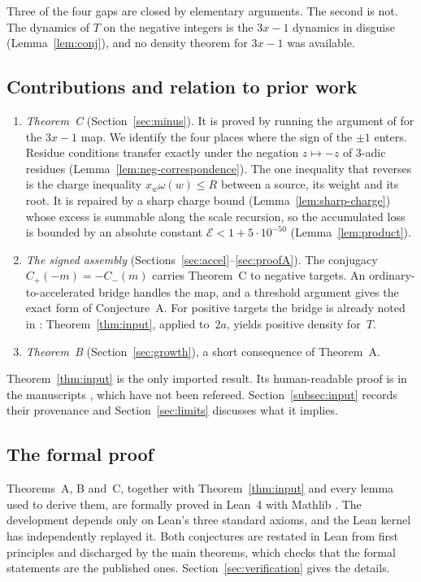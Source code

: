 \documentclass[11pt]{amsart}
\theoremstyle{definition}
\theoremstyle{remark}
\newcommand{\Cp}{C_{+}}
\newcommand{\Cm}{C_{-}}
\newcommand{\E}{\mathcal{E}}
\begin{document}
\noindent Three of the four gaps are closed by elementary arguments. The second is not. The
dynamics of $T$ on the negative integers is the $3x-1$ dynamics in disguise
(Lemma~\ref{lem:conj}), and no density theorem for $3x-1$ was available.

\subsection{Contributions and relation to prior work}
\begin{enumerate}[leftmargin=*,label=(\roman*)]
\item \emph{Theorem~C} (Section~\ref{sec:minus}). It is proved by running the argument of \cite{MazurM1,MazurM2} for the
  $3x-1$ map. We identify the four places where the sign of the $\pm1$ enters. Residue conditions
  transfer exactly under the negation $z\mapsto -z$ of $3$-adic residues
  (Lemma~\ref{lem:neg-correspondence}). The one inequality that reverses is the charge inequality
  $x_w\omega(w)\le R$ between a source, its weight and its root. It is repaired by a sharp charge
  bound (Lemma~\ref{lem:sharp-charge}) whose excess is summable along the scale recursion, so the
  accumulated loss is bounded by an absolute constant $\E<1+5\cdot10^{-50}$
  (Lemma~\ref{lem:product}).
\item \emph{The signed assembly} (Sections~\ref{sec:accel}--\ref{sec:proofA}). The conjugacy
  $\Cp(-m)=-\Cm(m)$ carries Theorem~C to negative targets. An ordinary-to-accelerated bridge
  handles the map, and a threshold argument gives the exact form of Conjecture~A. For positive
  targets the bridge is already noted in \cite[\S1.2]{MazurM2}: Theorem~\ref{thm:input}, applied
  to~$2a$, yields positive density for~$T$.
\item \emph{Theorem~B} (Section~\ref{sec:growth}), a short consequence of Theorem~A.
\end{enumerate}
Theorem~\ref{thm:input} is the only imported result. Its human-readable proof is in the
manuscripts \cite{MazurM1,MazurM2}, which have not been refereed. Section~\ref{subsec:input}
records their provenance and Section~\ref{sec:limits} discusses what it implies.

\subsection{The formal proof}
Theorems~A, B and~C, together with Theorem~\ref{thm:input} and every lemma used to derive them, are
formally proved in Lean~4 \cite{Lean4} with Mathlib \cite{Mathlib}. The development depends only
on Lean's three standard axioms, and the Lean kernel has independently replayed it. Both
conjectures are restated in Lean from first principles and discharged by the main theorems, which
checks that the formal statements are the published ones. Section~\ref{sec:verification} gives
the details.
\end{document}
